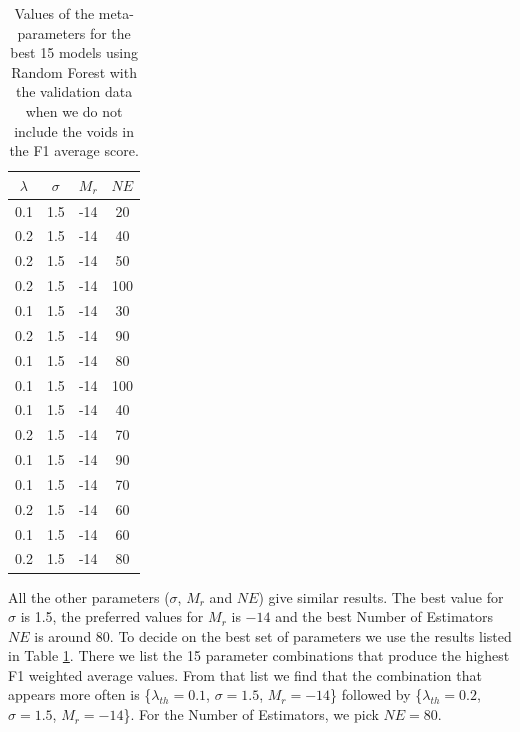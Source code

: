 \documentclass[usenatbib]{mnras}
\begin{document}
\begin{table}
\centering
\begin{tabular}{cccc}
\hline
   $\lambda$ &   $\sigma$ &   $M_r$ &   $NE$ \\
\hline
         0.1 &        1.5 &     -14 &     20 \\
         0.2 &        1.5 &     -14 &     40 \\
         0.2 &        1.5 &     -14 &     50 \\
         0.2 &        1.5 &     -14 &    100 \\
         0.1 &        1.5 &     -14 &     30 \\
         0.2 &        1.5 &     -14 &     90 \\
         0.1 &        1.5 &     -14 &     80 \\
         0.1 &        1.5 &     -14 &    100 \\
         0.1 &        1.5 &     -14 &     40 \\
         0.2 &        1.5 &     -14 &     70 \\
         0.1 &        1.5 &     -14 &     90 \\
         0.1 &        1.5 &     -14 &     70 \\
         0.2 &        1.5 &     -14 &     60 \\
         0.1 &        1.5 &     -14 &     60 \\
         0.2 &        1.5 &     -14 &     80 \\
\hline
\end{tabular}
\caption{Values of the meta-parameters for the best 15 models using Random Forest with the validation data when we do not include the voids in the F1 average score.}
\label{tab:parameters}
\end{table}

All the other parameters ($\sigma$, $M_r$ and $NE$) give similar results.
The best value for $\sigma$ is 1.5, the preferred values
for $M_r$ is $-14$ and the best Number of
Estimators $NE$ is around $80$.
To decide on the best set of parameters we use the results listed in
Table \ref{tab:parameters}.
There we list the 15 parameter combinations that
produce the highest F1 weighted average values.
From that list we find that the combination that appears more often is 
\{$\lambda_{th}=0.1$, $\sigma=1.5$, $M_r=-14$\} followed by 
\{$\lambda_{th}=0.2$, $\sigma=1.5$, $M_r=-14$\}.
For the Number of Estimators, we pick $NE=80$.
\end{document}
